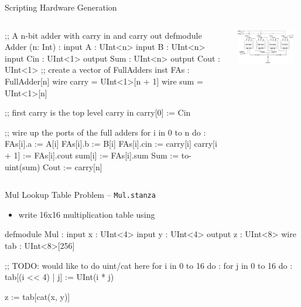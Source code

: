 \documentclass[xcolor=pdflatex,dvipsnames,table]{beamer}
\begin{document}
\begin{frame}[fragile]{Scripting Hardware Generation}

\begin{columns}

{
\begin{stanza}
;; A n-bit adder with carry in and carry out
defmodule Adder (n: Int) :
  input A : UInt<n>
  input B : UInt<n>
  input Cin : UInt<1>
  output Sum : UInt<n>
  output Cout : UInt<1>
  ;; create a vector of FullAdders
  inst FAs   : FullAdder[n]
  wire carry = UInt<1>[n + 1]
  wire sum   = UInt<1>[n]

  ;; first carry is the top level carry in
  carry[0] := Cin

  ;; wire up the ports of the full adders
  for i in 0 to n do :
    FAs[i].a     := A[i]
    FAs[i].b     := B[i]
    FAs[i].cin   := carry[i]
    carry[i + 1] := FAs[i].cout
    sum[i]       := FAs[i].sum
  Sum  := to-uint(sum)
  Cout := carry[n]
\end{stanza}
}


\begin{center}
\includegraphics[width=0.9\textwidth]{../getting-started/figs/4_Bit_Adder.jpg}
\end{center}
\end{columns}

\end{frame}

% 

\begin{frame}[fragile]{Mul Lookup Table Problem -- \tt Mul.stanza}
\begin{itemize}
\item write 16x16 multiplication table using 
\end{itemize}
\begin{stanza}
defmodule Mul :
  input x : UInt<4>
  input y : UInt<4>
  output z : UInt<8>
  wire tab : UInt<8>[256]

  ;; TODO: would like to do uint/cat here
  for i in 0 to 16 do : 
    for j in 0 to 16 do : 
      tab[(i << 4) | j] := UInt(i * j)

  z := tab[cat(x, y)]
\end{stanza}

\end{frame}
\end{document}
